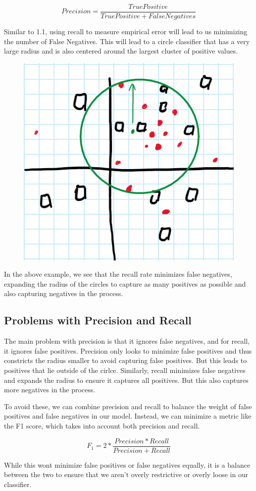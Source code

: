 \documentclass{article}
\begin{document}
\[Precision = \frac{True Positive}{True Positive + False Negatives}\]

\noindent
Similar to 1.1, using recall to measure empirical error will lead to us minimizing the number of False Negatives. This will lead to a circle classifier that has a very large radius and is also centered around the largest cluster of positive values.

\begin{figure}[h]
\centering
\includegraphics[width=0.35\linewidth]{Recall Figure.png}
\end{figure}

In the above example, we see that the recall rate minimizes false negatives, expanding the radius of the circles to capture as many positives as possible and also capturing negatives in the process.
\newpage
\subsection{Problems with Precision and Recall}
The main problem with precision is that it ignores false negatives, and for recall, it ignores false positives. Precision only looks to minimize false positives and thus constricts the radius smaller to avoid capturing false positives. But this leads to positives that lie outside of the cirlce. Similarly, recall minimizes false negatives and expands the radius to ensure it captures all positives. But this also captures more negatives in the process.

To avoid these, we can combine precision and recall to balance the weight of false positives and false negatives in our model. Instead, we can minimize a metric like the F1 score, which takes into account both precision and recall.

\[F_1 = 2 * \frac{Precision * Recall}{Precision + Recall}\]

While this wont minimize false positives or false negatives equally, it is a balance between the two to ensure that we aren't overly restrictive or overly loose in our classifier.

\newpage
\end{document}
